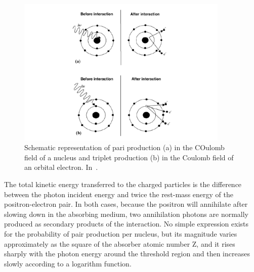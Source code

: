 \begin{figure}[!htbp]
\centering
\includegraphics[width=0.9\textwidth]{03_GraphicFiles/chapter2_GammaCameras/pairProd.pdf}
\caption{Schematic representation of pari production (a) in the COulomb field of a nucleus and triplet production (b) in the Coulomb field of an orbital electron. In~\cite{Podgorsak2010}.}
\label{chap2::fig::pairprod}
\end{figure} 

The total kinetic energy transferred to the charged particles is the difference between the photon incident energy and twice the rest-mass energy of the positron-electron pair.
In both cases, because the positron will annihilate after slowing down in the absorbing medium, two annihilation photons are normally produced as secondary products of the interaction. 
No simple expression exists for the probability of pair production per nucleus, but its magnitude varies approximately as the square of the absorber atomic number Z, and it rises sharply with the photon energy around the threshold region and then increases slowly according to a logarithm function. 

